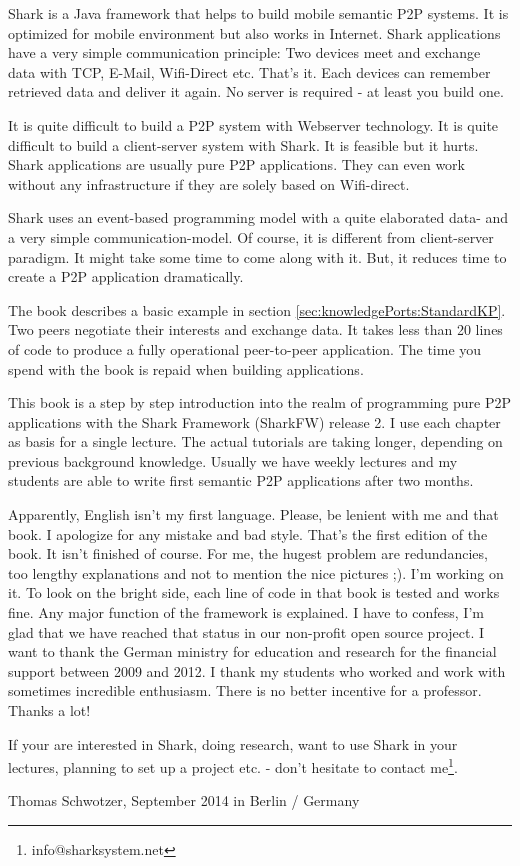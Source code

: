 Shark is a Java framework that helps to build mobile semantic P2P systems. It is optimized for mobile environment but also works in Internet. Shark applications have a very simple communication principle: Two devices meet and exchange data with TCP, E-Mail, Wifi-Direct etc. That's it. Each devices can remember retrieved data and deliver it again. No server is required - at least you build one.

It is quite difficult to build a P2P system with Webserver technology. It is quite difficult to build a client-server system with Shark. It is feasible but it hurts. Shark applications are usually pure P2P applications. They can even work without any infrastructure if they are solely based on Wifi-direct.

Shark uses an event-based programming model with a quite elaborated data- and a very simple communication-model. Of course, it is different from client-server paradigm. It might take some time to come along with it. But, it reduces time to create a P2P application dramatically.

The book describes a basic example in section \ref{sec:knowledgePorts:StandardKP}. Two peers negotiate their interests and exchange data. It takes less than 20 lines of code to produce a fully operational peer-to-peer application. The time you spend with the book is repaid when building applications.

This book is a step by step introduction into the realm of programming pure
P2P applications with the Shark Framework (SharkFW) release 2. I use each
chapter as basis for a single lecture. The actual tutorials are taking longer, depending on previous background knowledge. Usually we have weekly lectures and my students are able to write first semantic P2P applications after two months.

Apparently, English isn't my first language. Please, be lenient with me and that book. I apologize for any mistake and bad style. That's the first edition of the book. It isn't finished of course. For me, the hugest problem are redundancies, too lengthy explanations and not to mention the nice pictures ;). I'm working on it. To look on the bright side, each line of code in that book is tested and works fine. Any major function of the framework is explained. I have to confess, I'm glad that we have reached that status in our non-profit open source project.
I want to thank the German ministry for education and research for the financial support between 2009 and 2012. I thank my students who worked and work with sometimes incredible enthusiasm. There is no better incentive for a professor. Thanks a lot!

If your are interested in Shark, doing research, want to use Shark in your lectures, planning to set up a project etc. - don't hesitate to contact me\footnote{info@sharksystem.net}.

\vspace{1,5cm}

Thomas Schwotzer, September 2014 in Berlin / Germany
